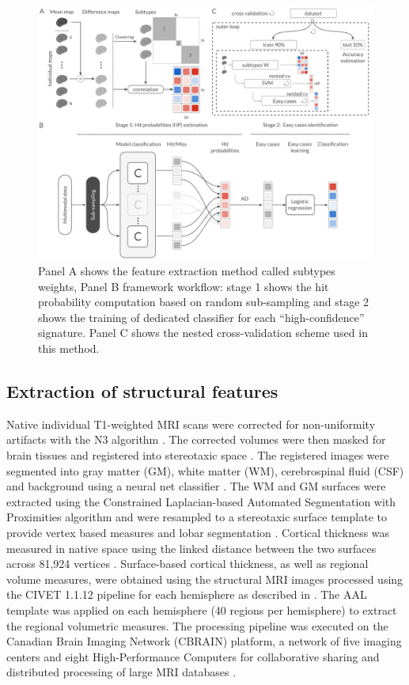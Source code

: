\documentclass[authoryear]{elsarticle}
\begin{document}
\begin{figure}%
\centering
\includegraphics[width=\linewidth]{figures/methods.png}
\caption{Panel A shows the feature extraction method called subtypes weights, Panel B framework workflow: stage 1 shows the hit probability computation based on random sub-sampling and stage 2 shows the training of dedicated classifier for each “high-confidence” signature. Panel C shows the nested cross-validation scheme used in this method.}
\label{fig_methods}
\end{figure}

\subsection*{Extraction of structural features}
Native individual T1-weighted MRI scans were corrected for non-uniformity artifacts with the N3 algorithm \citep{Sled1998}. The corrected volumes were then masked for brain tissues \citep{Smith2002} and registered into stereotaxic space \citep{Collins1994}. The registered images were segmented into gray matter (GM), white matter (WM), cerebrospinal fluid (CSF) and background using a neural net classifier \citep{Tohka2004}. The WM and GM surfaces were extracted using the Constrained Laplacian-based Automated Segmentation with Proximities algorithm \citep{Kim2005,Macdonald2000} and were resampled to a stereotaxic surface template to provide vertex based measures and lobar segmentation \citep{Lyttelton2007}. Cortical thickness was measured in native space using the linked distance between the two surfaces across 81,924 vertices \citep{Im2008}. Surface-based cortical thickness, as well as regional volume measures,  were obtained using the structural MRI images processed using the CIVET 1.1.12 pipeline for each hemisphere as described in \cite{Ad-Dabbagh2006}. The AAL template was applied on each hemisphere (40 regions per hemisphere) to extract the regional volumetric measures. The processing pipeline was executed on the Canadian Brain Imaging Network (CBRAIN) platform, a network of five imaging centers and eight High-Performance Computers for collaborative sharing and distributed processing of large MRI databases \citep{Frisoni2011}.
\end{document}
